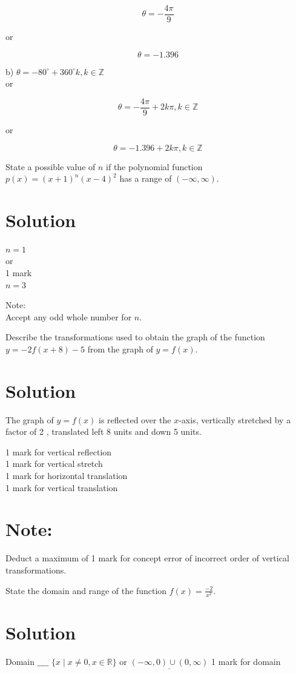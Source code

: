 \documentclass[10pt]{article}
\begin{document}
$$
\theta=-\frac{4 \pi}{9}
$$

or

$$
\theta=-1.396
$$

b) $\theta=-80^{\circ}+360^{\circ} k, k \in \mathbb{Z}$\\
or

$$
\theta=-\frac{4 \pi}{9}+2 k \pi, k \in \mathbb{Z}
$$

or

$$
\theta=-1.396+2 k \pi, k \in \mathbb{Z}
$$

State a possible value of $n$ if the polynomial function $p(x)=(x+1)^{n}(x-4)^{2}$ has a range of $(-\infty, \infty)$.

\section*{Solution}
$n=1$\\
or\\
1 mark\\
$n=3$

Note:\\
Accept any odd whole number for $n$.

Describe the transformations used to obtain the graph of the function $y=-2 f(x+8)-5$ from the graph of $y=f(x)$.

\section*{Solution}
The graph of $y=f(x)$ is reflected over the $x$-axis, vertically stretched by a factor of 2 , translated left 8 units and down 5 units.

1 mark for vertical reflection\\
1 mark for vertical stretch\\
1 mark for horizontal translation\\
1 mark for vertical translation

\section*{Note:}
Deduct a maximum of 1 mark for concept error of incorrect order of vertical transformations.

State the domain and range of the function $f(x)=\frac{-2}{x^{2}}$.

\section*{Solution}
Domain $\_\_\_\_$ $\{x \mid x \neq 0, x \in \mathbb{R}\}$ or $\underline{(-\infty, 0) \cup(0, \infty)}$ 1 mark for domain
\end{document}

